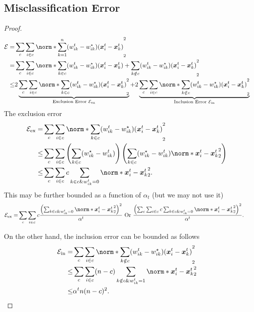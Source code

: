 \documentclass{article}
\begin{document}
\subsection{Misclassification Error}
\begin{proof}
  \begin{align*}
    \cE=&\sum_c \sum_{i\in c}\norm*{ \sum_{k=1}^n (w^t_{ik}-w^{\star}_{ik})(\xx^t_i - \xx^t_k)}_2^2 \\
    =&\sum_c \sum_{i\in c}\norm*{ \sum_{k\in c} (w^t_{ik}-w^{\star}_{ik})(\xx^t_i - \xx^t_k) + \sum_{k\notin c} (w^t_{ik}-w^{\star}_{ik})(\xx^t_i - \xx^t_k)}_2^2 \\
    \le& 2\underbrace{\sum_c \sum_{i\in c}\norm*{ \sum_{k\in c} (w^t_{ik}-w^{\star}_{ik})(\xx^t_i - \xx^t_k)}_2^2}_\text{Exclusion Error $\cE_\text{ex}$} +2\underbrace{\sum_c \sum_{i\in c}\norm*{\sum_{k\notin c} (w^t_{ik}-w^{\star}_{ik})(\xx^t_i - \xx^t_k)}_2^2}_\text{Inclusion Error $\cE_\text{in}$}
  \end{align*}
  The exclusion error
  \begin{align*}
    \cE_\text{ex}=&\sum_c \sum_{i\in c}\norm*{ \sum_{k\in c} (w^t_{ik}-w^{\star}_{ik})(\xx^t_i - \xx^t_k)}_2^2 \\
    \le& \sum_c \sum_{i\in c} \left(\sum_{k\in c} (w^{\star}_{ik}-w^t_{ik})\right) \left(\sum_{k\in c} (w^{\star}_{ik}-w^t_{ik}) \norm*{ \xx^t_i - \xx^t_k}_2^2\right) \\
    \le& \sum_c \sum_{i\in c} c \sum_{k\in c \& w_{ik}^t = 0}  \norm*{ \xx^t_i - \xx^t_k}_2^2.
  \end{align*}
  This may be further bounded as a function of $\alpha_t$ (but we may not use it)
  \begin{align*}
    \cE_\text{ex}=& \sum_c \sum_{i\in c} c \frac{\left(\sum_{k\in c \& w_{ik}^t = 0}  \norm*{ \xx^t_i - \xx^t_k}_2^2\right)^2}{\alpha^t}
    \text{ Or }  \frac{\left(\sum_c \sum_{i\in c} c \sum_{k\in c \& w_{ik}^t = 0}  \norm*{ \xx^t_i - \xx^t_k}_2^2\right)^2}{\alpha^t}.
  \end{align*}

  On the other hand, the inclusion error can be bounded as follows
  \begin{align*}
    \cE_\text{in}=&\sum_c \sum_{i\in c}\norm*{\sum_{k\notin c} (w^t_{ik}-w^{\star}_{ik})(\xx^t_i - \xx^t_k)}_2^2 \\
    \le&  \sum_c \sum_{i\in c} (n-c)\sum_{k\notin c\& w_{ik}^t=1} \norm*{\xx^t_i - \xx^t_k}_2^2 \\
    \le& \alpha^t n (n-c)^2.
  \end{align*}
\end{proof}
\end{document}
